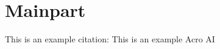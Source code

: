 \section{Mainpart}\label{sec: Mainpart}

This is an example citation: \autocite{example}
This is an example Acro \ac{AI}